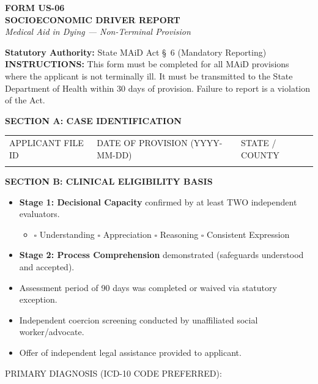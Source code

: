 \documentclass[10pt]{article}
\begin{document}
\begin{center}
    \textbf{\Large FORM US-06}\\[0.5em]
    \textbf{\Large SOCIOECONOMIC DRIVER REPORT}\\[0.2em]
    \textit{Medical Aid in Dying --- Non-Terminal Provision}\\[0.5em]
\end{center}

\vspace{0.5em}
\noindent\textbf{Statutory Authority:} State MAiD Act \S~6 (Mandatory Reporting)\\[0.5em]
\noindent\textbf{INSTRUCTIONS:} This form must be completed for all MAiD provisions where the applicant is not terminally ill. It must be transmitted to the State Department of Health within 30 days of provision. Failure to report is a violation of the Act.

\vspace{1em}
\noindent\textbf{\large SECTION A: CASE IDENTIFICATION}
\vspace{0.5em}\\
\noindent\begin{tabularx}{\textwidth}{|X|X|X|}
\hline
APPLICANT FILE ID & DATE OF PROVISION (YYYY-MM-DD) & STATE / COUNTY \\
\vspace{1.5em} & \vspace{1.5em} & \vspace{1.5em} \\
\hline
\end{tabularx}

\vspace{0.5em}
\noindent\textbf{\large SECTION B: CLINICAL ELIGIBILITY BASIS}
\begin{itemize}
    \item[$\square$] \textbf{Stage 1: Decisional Capacity} confirmed by at least TWO independent evaluators.
    \begin{itemize}
        \item[] $\square$ Understanding \quad $\square$ Appreciation \quad $\square$ Reasoning \quad $\square$ Consistent Expression
    \end{itemize}
    \item[$\square$] \textbf{Stage 2: Process Comprehension} demonstrated (safeguards understood and accepted).
    \item[$\square$] Assessment period of 90 days was completed or waived via statutory exception.
    \item[$\square$] Independent coercion screening conducted by unaffiliated social worker/advocate.
    \item[$\square$] Offer of independent legal assistance provided to applicant.
\end{itemize}
\vspace{0.5em}
\noindent PRIMARY DIAGNOSIS (ICD-10 CODE PREFERRED): \hrulefill
\end{document}
